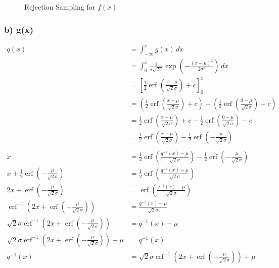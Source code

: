 \begin{figure}[htbp]
    \centering
    
    \caption{Rejection Sampling for $f(x)$}
    \label{fig:2-3-rejection-f}
\end{figure}

\subsubsection*{b) g(x)}

\begin{align}
q(x)
&= \int_{-\infty}^x g(x)\,dx \\
&= \int_{0}^x \frac{1}{\sigma \sqrt{2 \pi}} \exp\left(- \frac{(x-\mu)^2}{2\sigma^2}\right)\,dx \\
&= \left[\frac{1}{2} \operatorname{erf} \left(\frac{x-\mu}{\sqrt{2} \sigma}\right) + c\right]_0^x \\
&= \left(\frac{1}{2} \operatorname{erf} \left(\frac{x-\mu}{\sqrt{2} \sigma}\right) + c\right) - \left(\frac{1}{2} \operatorname{erf} \left(\frac{0-\mu}{\sqrt{2} \sigma}\right) + c\right)\\
&= \frac{1}{2} \operatorname{erf} \left(\frac{x-\mu}{\sqrt{2} \sigma}\right) + c - \frac{1}{2} \operatorname{erf} \left(\frac{0-\mu}{\sqrt{2} \sigma}\right) - c\\
&= \frac{1}{2} \operatorname{erf} \left(\frac{x-\mu}{\sqrt{2} \sigma}\right) - \frac{1}{2} \operatorname{erf} \left(- \frac{\mu}{\sqrt{2} \sigma}\right) \\
\\
x &= \frac{1}{2} \operatorname{erf} \left(\frac{q^{-1}(x)-\mu}{\sqrt{2} \sigma}\right) - \frac{1}{2} \operatorname{erf} \left(- \frac{\mu}{\sqrt{2} \sigma}\right) \\
x + \frac{1}{2} \operatorname{erf} \left(- \frac{\mu}{\sqrt{2} \sigma}\right) &= \frac{1}{2} \operatorname{erf} \left(\frac{q^{-1}(x)-\mu}{\sqrt{2} \sigma}\right) \\
2 x + \operatorname{erf} \left(- \frac{\mu}{\sqrt{2} \sigma}\right) &= \operatorname{erf} \left(\frac{q^{-1}(x)-\mu}{\sqrt{2} \sigma}\right) \\
\operatorname{erf}^{-1} \left( 2 x + \operatorname{erf} \left(- \frac{\mu}{\sqrt{2} \sigma}\right) \right) &= \frac{q^{-1}(x)-\mu}{\sqrt{2} \sigma} \\
\sqrt{2} \sigma \operatorname{erf}^{-1} \left( 2 x + \operatorname{erf} \left(- \frac{\mu}{\sqrt{2} \sigma}\right) \right) &= q^{-1}(x)-\mu \\
\sqrt{2} \sigma \operatorname{erf}^{-1} \left( 2 x + \operatorname{erf} \left(- \frac{\mu}{\sqrt{2} \sigma}\right) \right)  + \mu &= q^{-1}(x) \\
q^{-1}(x) &= \sqrt{2} \sigma \operatorname{erf}^{-1} \left( 2 x + \operatorname{erf} \left(- \frac{\mu}{\sqrt{2} \sigma}\right) \right)  + \mu
\end{align}

